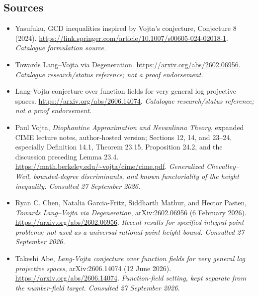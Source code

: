 \documentclass[11pt,a4paper]{article}
\numberwithin{equation}{section}
\begin{document}
\subsection{Sources}
\begin{itemize}\raggedright
\item[\textnormal{[S1]}]\hypertarget{source:30005098:1}{} Yasufuku, GCD inequalities inspired by Vojta's conjecture, Conjecture 8 (2024).
\url{https://link.springer.com/article/10.1007/s00605-024-02018-1}.
{\small\textit{Catalogue formulation source.}}
\item[\textnormal{[S2]}]\hypertarget{source:30005098:2}{} Towards Lang--Vojta via Degeneration.
\url{https://arxiv.org/abs/2602.06956}.
{\small\textit{Catalogue research/status reference; not a proof endorsement.}}
\item[\textnormal{[S3]}]\hypertarget{source:30005098:3}{} Lang-Vojta conjecture over function fields for very general log projective spaces.
\url{https://arxiv.org/abs/2606.14074}.
{\small\textit{Catalogue research/status reference; not a proof endorsement.}}

\item[\textnormal{[E1]}]\hypertarget{extra:30005098:1}{} Paul Vojta, \emph{Diophantine Approximation and Nevanlinna Theory}, expanded CIME lecture notes, author-hosted version; Sections 12, 14, and 23--24, especially Definition 14.1, Theorem 23.15, Proposition 24.2, and the discussion preceding Lemma 23.4.
\url{https://math.berkeley.edu/~vojta/cime/cime.pdf}.
{\small\textit{Generalized Chevalley--Weil, bounded-degree discriminants, and known functoriality of the height inequality. Consulted 27 September 2026.}}
\item[\textnormal{[E2]}]\hypertarget{extra:30005098:2}{} Ryan C. Chen, Natalia Garcia-Fritz, Siddharth Mathur, and Hector Pasten, \emph{Towards Lang--Vojta via Degeneration}, arXiv:2602.06956 (6 February 2026).
\url{https://arxiv.org/abs/2602.06956}.
{\small\textit{Recent results for specified integral-point problems; not used as a universal rational-point height bound. Consulted 27 September 2026.}}
\item[\textnormal{[E3]}]\hypertarget{extra:30005098:3}{} Takeshi Abe, \emph{Lang-Vojta conjecture over function fields for very general log projective spaces}, arXiv:2606.14074 (12 June 2026).
\url{https://arxiv.org/abs/2606.14074}.
{\small\textit{Function-field setting, kept separate from the number-field target. Consulted 27 September 2026.}}
\end{itemize}
\end{document}
